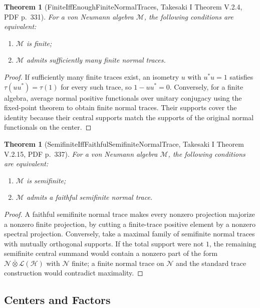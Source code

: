 \documentclass{article}
\newtheorem{theorem}[definition]{Theorem}
\begin{document}
\begin{theorem}[FiniteIffEnoughFiniteNormalTraces, Takesaki I Theorem V.2.4, PDF p.~331]
For a von Neumann algebra \(\mathcal M\), the following conditions are
equivalent:
\begin{enumerate}
\item \(\mathcal M\) is finite;
\item \(\mathcal M\) admits sufficiently many finite normal traces.
\end{enumerate}
\end{theorem}

\begin{proof}
If sufficiently many finite traces exist, an isometry \(u\) with \(u^*u=1\)
satisfies \(\tau(uu^*)=\tau(1)\) for every such trace, so \(1-uu^*=0\).
Conversely, for a finite algebra, average normal positive functionals over
unitary conjugacy using the fixed-point theorem to obtain finite normal
traces.  Their supports cover the identity because their central supports
match the supports of the original normal functionals on the center.
\end{proof}

\begin{theorem}[SemifiniteIffFaithfulSemifiniteNormalTrace, Takesaki I Theorem V.2.15, PDF p.~337]
For a von Neumann algebra \(\mathcal M\), the following conditions are
equivalent:
\begin{enumerate}
\item \(\mathcal M\) is semifinite;
\item \(\mathcal M\) admits a faithful semifinite normal trace.
\end{enumerate}
\end{theorem}

\begin{proof}
A faithful semifinite normal trace makes every nonzero projection majorize a
nonzero finite projection, by cutting a finite-trace positive element by a
nonzero spectral projection.  Conversely, take a maximal family of semifinite
normal traces with mutually orthogonal supports.  If the total support were
not \(1\), the remaining semifinite central summand would contain a nonzero
part of the form \(\mathcal N\bar\otimes\mathcal L(\mathcal H)\) with
\(\mathcal N\) finite; a finite normal trace on \(\mathcal N\) and the
standard trace construction would contradict maximality.
\end{proof}

\subsection*{Centers and Factors}
\end{document}
